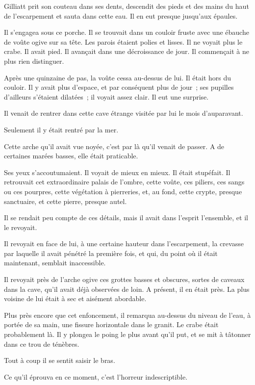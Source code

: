\documentclass[french,twoside]{book} %
\begin{document}
Gilliatt prit son couteau dans ses dents, descendit des pieds et des mains du haut de l’escarpement et sauta dans cette eau. Il en eut presque jusqu’aux épaules.\par
Il s’engagea sous ce porche. Il se trouvait dans un couloir fruste avec une ébauche de voûte ogive sur sa tête. Les parois étaient polies et lisses. Il ne voyait plus le crabe. Il avait pied. Il avançait dans une décroissance de jour. Il commençait à ne plus rien distinguer.\par
Après une quinzaine de pas, la voûte cessa au-dessus de lui. Il était hors du couloir. Il y avait plus d’espace, et par conséquent plus de jour ; ses pupilles d’ailleurs s’étaient dilatées ; il voyait assez clair. Il eut une surprise.\par
Il venait de rentrer dans cette cave étrange visitée par lui le mois d’auparavant.\par
 Seulement il y était rentré par la mer.\par
Cette arche qu’il avait vue noyée, c’est par là qu’il venait de passer. A de certaines marées basses, elle était praticable.\par
Ses yeux s’accoutumaient. Il voyait de mieux en mieux. Il était stupéfait. Il retrouvait cet extraordinaire palais de l’ombre, cette voûte, ces piliers, ces sangs ou ces pourpres, cette végétation à pierreries, et, au fond, cette crypte, presque sanctuaire, et cette pierre, presque autel.\par
Il se rendait peu compte de ces détails, mais il avait dans l’esprit l’ensemble, et il le revoyait.\par
Il revoyait en face de lui, à une certaine hauteur dans l’escarpement, la crevasse par laquelle il avait pénétré la première fois, et qui, du point où il était maintenant, semblait inaccessible.\par
Il revoyait près de l’arche ogive ces grottes basses et obscures, sortes de caveaux dans la cave, qu’il avait déjà observées de loin. A présent, il en était près. La plus voisine de lui était à sec et aisément abordable.\par
Plus près encore que cet enfoncement, il remarqua au-dessus du niveau de l’eau, à portée de sa main, une fissure horizontale dans le granit. Le crabe était probablement là. Il y plongea le poing le plus avant qu’il put, et se mit à tâtonner dans ce trou de ténèbres.\par
Tout à coup il se sentit saisir le bras.\par
Ce qu’il éprouva en ce moment, c’est l’horreur indescriptible.\par
\end{document}
